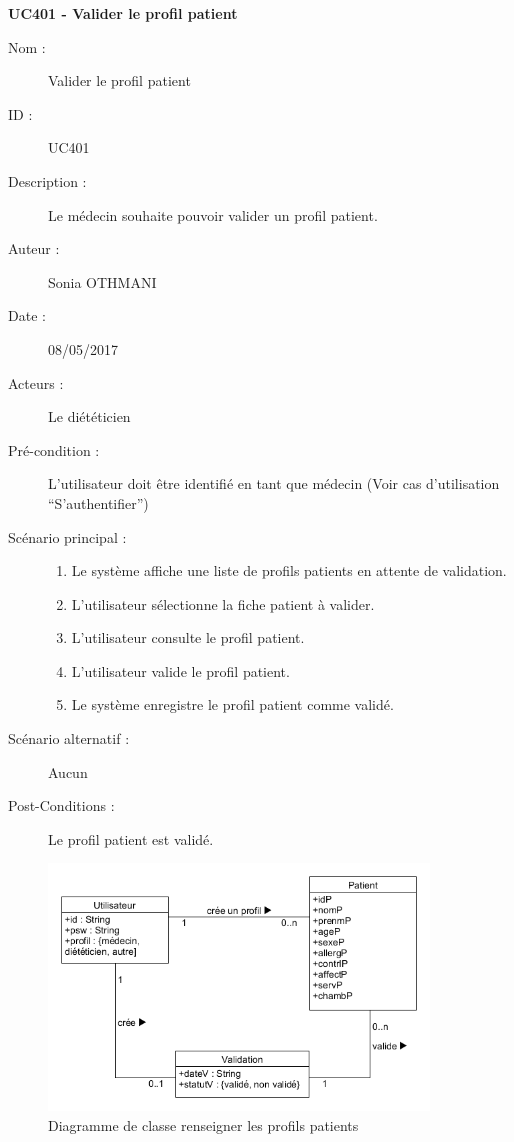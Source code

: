 \textbf{UC401 - Valider le profil patient}
\begin{description}
\item [Nom :] Valider le profil patient
\item [ID :] UC401
\item [Description :] Le médecin souhaite pouvoir valider un profil patient.
\item [Auteur :] Sonia OTHMANI
\item [Date :] 08/05/2017
\item [Acteurs :] Le diététicien
\item [Pré-condition :] L’utilisateur doit être identifié en tant que médecin (Voir cas d’utilisation \enquote{S’authentifier})
\item [Scénario principal :]
  \begin{enumerate}
  \item Le système affiche une liste de profils patients en attente de validation.
  \item L’utilisateur sélectionne la fiche patient à valider.
  \item L’utilisateur consulte le profil patient.
  \item L’utilisateur valide le profil patient.
  \item Le système enregistre le profil patient comme validé.
  \end{enumerate}
\item [Scénario alternatif :] Aucun
\item [Post-Conditions :] Le profil patient est validé.
\end{description}

\begin{figure}
  \label{diagramme-renseigner-les-profils-patients}
  \centering
  \includegraphics[width=0.9\textwidth]{../../CasDUtilisations/ProfilPatient/diagclassProfilPatient.png}
  \caption{Diagramme de classe renseigner les profils patients}
\end{figure}


